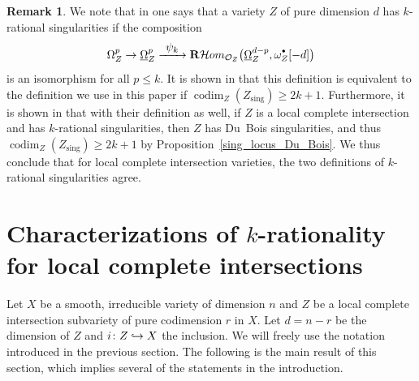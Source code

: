 \documentclass[JEP,XML,SOM,Unicode]{cedram}
\newcommand{\To}[1]{\mathchoice{\xrightarrow{\textstyle\kern4pt#1\kern3pt}}{\stackrel{#1}{\longrightarrow}}{}{}}
\newcommand\hto{\mathrel{\lhook\joinrel\to}}
\newcommand{\sbullet}{{\scriptscriptstyle\bullet}}
\newcommand{\csbullet}{{\raisebox{1pt}{$\sbullet$}}}
\theoremstyle{plain}
\theoremstyle{definition}
\newtheorem{rmk}[thm]{Remark}
\newcommand\R{{\mathbf R}}
\newcommand\cH{\mathcal{H}}
\newcommand\cO{\mathcal{O}}
\newcommand\cH{\mathcal{H}}
\newcommand\cO{\mathcal{O}}
\newcommand\sing{\mathrm{sing}}
\DeclareMathOperator{\codim}{codim}
\begin{document}
\begin{rmk}\label{rmk_equiv_two_defi}
We note that in \cite{FL2} one says that a variety $Z$ of pure dimension $d$ has $k$-rational singularities if the composition
\[\Omega_Z^p\to \underline{\Omega}_Z^p\To{\psi_k}\R\cH om_{\cO_Z}\big(\underline{\Omega}_Z^{d-p},\omega_Z^{\csbullet}[-d]\big)\]
is an isomorphism for all $p\leq k$. It is shown in \cite[Cor.\,3.17]{FL2} that this definition is equivalent to the definition we use in this paper if $\codim_Z(Z_\sing)\geq 2k+1$.
Furthermore, it is shown in \cite[Th.\,3.20]{FL2} that with their definition as well, if $Z$ is a local complete intersection and has $k$-rational singularities,
then $Z$ has Du~Bois singularities, and thus $\codim_Z(Z_\sing)\geq 2k+1$ by Proposition~\ref{sing_locus_Du_Bois}. We thus conclude
that for local complete intersection varieties, the two definitions of $k$-rational singularities agree.
\end{rmk}

\section{Characterizations of \texorpdfstring{$k$}{k}-rationality for local complete intersections}\label{section3}

Let $X$ be a smooth, irreducible variety of dimension $n$ and $Z$ be a local complete intersection subvariety of pure codimension $r$ in $X$. Let $d=n-r$ be the dimension of $Z$ and $i\colon Z\hto X$ the inclusion. We will freely use the notation introduced in the previous section.
The following is the main result of this section, which implies several of the statements in the introduction.
\end{document}
